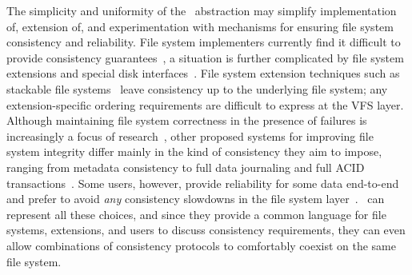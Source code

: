 The simplicity and uniformity of the \patch\ abstraction may simplify
 implementation of, extension of, and experimentation with mechanisms for
 ensuring file system consistency and reliability.
%
File system implementers currently find it difficult to provide
 consistency guarantees~\cite{tweedie98journaling,mckusick99soft},
 a situation is further complicated by file system extensions and
 special disk interfaces~\cite{soules03metadata,fast04versionfs,quinlan02venti,cornell04wayback,wright03ncryptfs,sivathanu03semantically-smart,sivathanu05database-aware}.
%
File system extension techniques such as stackable file
 systems~\cite{zadok00fist,zadok99extending,heidemann94filesystem,rosenthal90evolving}
 leave consistency up to the underlying file system; any extension-specific
 ordering requirements are difficult to express at the VFS layer.
%
Although maintaining file system
 correctness in the presence of failures is increasingly a focus of
 research~\cite{sivathanuetal05-logic,denehyetal05-journal-guided},
%
other proposed systems for improving file system integrity
 differ mainly in the kind of consistency they aim to impose, ranging from
 metadata consistency to full data journaling and full ACID
 transactions~\cite{gal05transactional,liskov04transactional}.
%
Some users, however, provide reliability for some data end-to-end
 and prefer to avoid \emph{any} consistency
 slowdowns in the file system layer~\cite{googleext2}.
%
\Patches\ can represent all these choices, and since they provide a common
 language for file systems, extensions, and users to discuss consistency
 requirements, they can even allow combinations of consistency protocols to
 comfortably coexist on the same file system.


\begin{comment}
But different extensions within a file system, or different
 applications over the file system, may require different types of
 consistency semantics, and performance suffers when lower layers are
 unnecessarily denied the opportunity to reorder writes;
\Patches\ can implement many consistency mechanisms, including
 soft updates and journaling, and can allow combinations of different
 consistency protocols to exist at the same time.
\Patches\ provide a simple and effective way for such extensions to
 express their requirements of the storage system, adding to the
 requirements already expressed by the file system itself.
\end{comment}


